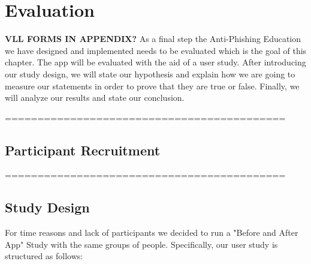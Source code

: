 \section{Evaluation}
\label{s:evaluation}
\textbf{VLL FORMS IN APPENDIX? }As a final step the Anti-Phishing Education we have designed and implemented needs to be evaluated which is the goal of this chapter.
 The app will be evaluated with the aid of a user study.
 After introducing our study design, we will state our hypothesis and explain how we are going to measure our statements in order to prove that they are true or false.
 Finally, we will analyze our results and state our conclusion.


===========================================
\subsection{Participant Recruitment}
===========================================


\subsection{Study Design}
For time reasons and lack of participants we decided to run a "Before and After App" Study with the same groups of people.
 Specifically, our user study is structured as follows:

